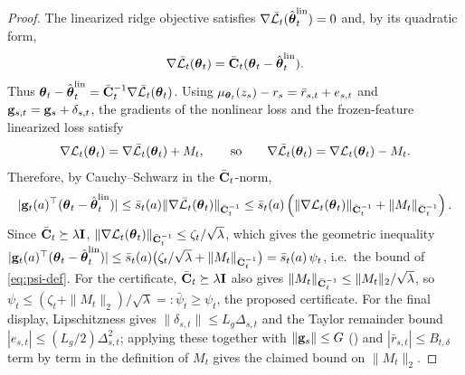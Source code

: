 \begin{proof}
The linearized ridge objective satisfies
$\nabla \bar{\mathcal{L}}_t(\hat{\boldsymbol{\theta}}_t^{\mathrm{lin}})=0$ and, by its
quadratic form,
\[
  \nabla \bar{\mathcal{L}}_t(\boldsymbol{\theta}_t)
  =
  \bar{\mathbf{C}}_t(\boldsymbol{\theta}_t-\hat{\boldsymbol{\theta}}_t^{\mathrm{lin}}).
\]
Thus
$\boldsymbol{\theta}_t-\hat{\boldsymbol{\theta}}_t^{\mathrm{lin}}
=\bar{\mathbf{C}}_t^{-1}\nabla\bar{\mathcal{L}}_t(\boldsymbol{\theta}_t)$.
Using
$\mu_{\boldsymbol{\theta}_t}(z_s)-r_s=\bar r_{s,t}+e_{s,t}$ and
$\mathbf{g}_{s,t}=\mathbf{g}_s+\delta_{s,t}$, the gradients of the nonlinear loss
and the frozen-feature linearized loss satisfy
\[
  \nabla \mathcal{L}_t(\boldsymbol{\theta}_t)
  =
  \nabla \bar{\mathcal{L}}_t(\boldsymbol{\theta}_t)+M_t,
  \qquad
  \text{so}\qquad
  \nabla \bar{\mathcal{L}}_t(\boldsymbol{\theta}_t)=\nabla \mathcal{L}_t(\boldsymbol{\theta}_t)-M_t .
\]
Therefore, by Cauchy--Schwarz in the $\bar{\mathbf{C}}_t$-norm,
\[
  |\mathbf{g}_t(a)^\top(\boldsymbol{\theta}_t-\hat{\boldsymbol{\theta}}_t^{\mathrm{lin}})|
  \le
  \bar s_t(a)
  \|\nabla \bar{\mathcal{L}}_t(\boldsymbol{\theta}_t)\|_{\bar{\mathbf{C}}_t^{-1}}
  \le
  \bar s_t(a)
  \left(
    \|\nabla \mathcal{L}_t(\boldsymbol{\theta}_t)\|_{\bar{\mathbf{C}}_t^{-1}}
    +
    \|M_t\|_{\bar{\mathbf{C}}_t^{-1}}
  \right).
\]
Since $\bar{\mathbf{C}}_t\succeq\lambda\mathbf{I}$,
$\|\nabla \mathcal{L}_t(\boldsymbol{\theta}_t)\|_{\bar{\mathbf{C}}_t^{-1}}\le \zeta_t/\sqrt{\lambda}$,
which gives the geometric inequality
$|\mathbf{g}_t(a)^\top(\boldsymbol{\theta}_t-\hat{\boldsymbol{\theta}}_t^{\mathrm{lin}})|
\le\bar s_t(a)\bigl(\zeta_t/\sqrt{\lambda}+\|M_t\|_{\bar{\mathbf{C}}_t^{-1}}\bigr)
=\bar s_t(a)\,\psi_t$, i.e.\ the bound of \eqref{eq:psi-def}.
For the certificate, $\bar{\mathbf{C}}_t\succeq\lambda\mathbf{I}$ also gives
$\|M_t\|_{\bar{\mathbf{C}}_t^{-1}}\le\|M_t\|_2/\sqrt{\lambda}$, so
$\psi_t\le(\zeta_t+\|M_t\|_2)/\sqrt{\lambda}=:\bar\psi_t\ge\psi_t$, the proposed
certificate.
For the final display, Lipschitzness gives
$\|\delta_{s,t}\|\le L_g\Delta_{s,t}$ and the Taylor remainder bound
$|e_{s,t}|\le (L_g/2)\Delta_{s,t}^2$; applying these together with
$\|\mathbf{g}_s\|\le G$ () and $|\bar r_{s,t}|\le B_{t,\delta}$
term by term in the definition of $M_t$ gives the claimed bound on $\|M_t\|_2$.
\end{proof}

